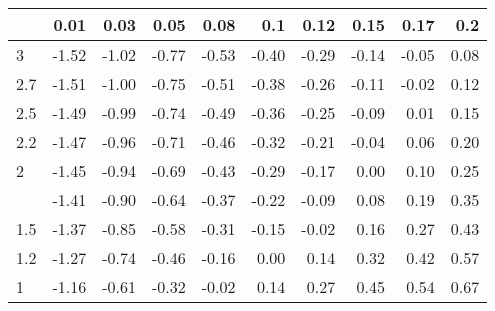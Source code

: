 
\begin{tabular}{lrrrrrrrrr}
\toprule
  & 0.01 & 0.03 & 0.05 & 0.08 & 0.1 & 0.12 & 0.15 & 0.17 & 0.2\\
\midrule
3 & -1.52 & -1.02 & -0.77 & -0.53 & -0.40 & -0.29 & -0.14 & -0.05 & 0.08\\
2.7 & -1.51 & -1.00 & -0.75 & -0.51 & -0.38 & -0.26 & -0.11 & -0.02 & 0.12\\
2.5 & -1.49 & -0.99 & -0.74 & -0.49 & -0.36 & -0.25 & -0.09 & 0.01 & 0.15\\
2.2 & -1.47 & -0.96 & -0.71 & -0.46 & -0.32 & -0.21 & -0.04 & 0.06 & 0.20\\
2 & -1.45 & -0.94 & -0.69 & -0.43 & -0.29 & -0.17 & 0.00 & 0.10 & 0.25\\
\addlinespace
1.7 & -1.41 & -0.90 & -0.64 & -0.37 & -0.22 & -0.09 & 0.08 & 0.19 & 0.35\\
1.5 & -1.37 & -0.85 & -0.58 & -0.31 & -0.15 & -0.02 & 0.16 & 0.27 & 0.43\\
1.2 & -1.27 & -0.74 & -0.46 & -0.16 & 0.00 & 0.14 & 0.32 & 0.42 & 0.57\\
1 & -1.16 & -0.61 & -0.32 & -0.02 & 0.14 & 0.27 & 0.45 & 0.54 & 0.67\\
\bottomrule
\end{tabular}
